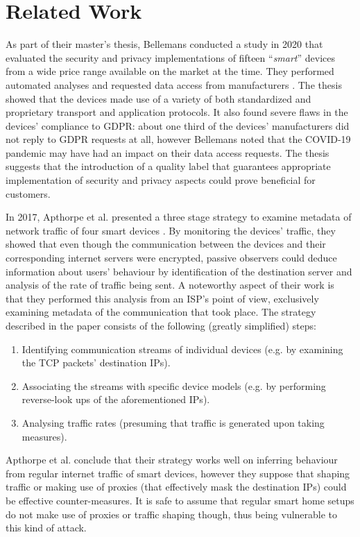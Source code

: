 \chapter{Related Work}
\label{chap:related-work}

As part of their master's thesis, Bellemans conducted a study in 2020 that evaluated the security and privacy implementations of fifteen \enquote{\emph{smart}} devices from a wide price range available on the market at the time. They performed automated analyses and requested data access from manufacturers \cite{JonahBellemans}. The thesis showed that the devices made use of a variety of both standardized and proprietary transport and application protocols. It also found severe flaws in the devices' compliance to \ac{GDPR}: about one third of the devices' manufacturers did not reply to \ac{GDPR} requests at all, however Bellemans noted that the COVID-19 pandemic may have had an impact on their data access requests. The thesis suggests that the introduction of a quality label that guarantees appropriate implementation of security and privacy aspects could prove beneficial for customers. \par
In 2017, Apthorpe et al. presented a three stage strategy to examine metadata of network traffic of four smart devices \cite{apthorpe2017smart}.
By monitoring the devices' traffic, they showed that even though the communication between the devices and their corresponding internet servers were encrypted, passive observers could deduce information about users' behaviour by identification of the destination server and analysis of the rate of traffic being sent. A noteworthy aspect of their work is that they performed this analysis from an \ac{ISP}'s point of view, exclusively examining metadata of the communication that took place. The strategy described in the paper consists of the following (greatly simplified) steps:
\begin{enumerate}
    \item Identifying communication streams of individual devices (e.g. by examining the TCP packets' destination IPs).
    \item Associating the streams with specific device models (e.g. by performing reverse-look ups of the aforementioned IPs).
    \item Analysing traffic rates (presuming that traffic is generated upon taking measures).
\end{enumerate}


Apthorpe et al. conclude that their strategy works well on inferring behaviour from regular internet traffic of smart devices, however they suppose that shaping traffic or making use of proxies (that effectively mask the destination IPs) could be effective counter-measures. It is safe to assume that regular smart home setups do not make use of proxies or traffic shaping though, thus being vulnerable to this kind of attack. 